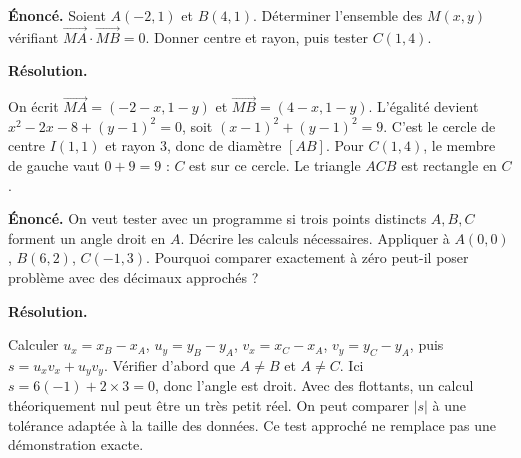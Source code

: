\documentclass[11pt,a4paper]{article}
\begin{document}
\par\noindent\begin{minipage}{\linewidth}
{\small\color{Muted}\textbf{Énoncé.} Soient $A(-2,1)$ et $B(4,1)$. Déterminer l’ensemble des $M(x,y)$ vérifiant $\overrightarrow{MA}\cdot\overrightarrow{MB}=0$. Donner centre et rayon, puis tester $C(1,4)$.}
\par\medskip
\textbf{Résolution.}\par
On écrit $\overrightarrow{MA}=(-2-x,1-y)$ et $\overrightarrow{MB}=(4-x,1-y)$. L’égalité devient $x^2-2x-8+(y-1)^2=0$, soit $(x-1)^2+(y-1)^2=9$. C’est le cercle de centre $I(1,1)$ et rayon $3$, donc de diamètre $[AB]$. Pour $C(1,4)$, le membre de gauche vaut $0+9=9$ : $C$ est sur ce cercle. Le triangle $ACB$ est rectangle en $C$.
\end{minipage}\par
\par\noindent\begin{minipage}{\linewidth}
{\small\color{Muted}\textbf{Énoncé.} On veut tester avec un programme si trois points distincts $A,B,C$ forment un angle droit en $A$. Décrire les calculs nécessaires. Appliquer à $A(0,0)$, $B(6,2)$, $C(-1,3)$. Pourquoi comparer exactement à zéro peut-il poser problème avec des décimaux approchés ?}
\par\medskip
\textbf{Résolution.}\par
Calculer $u_x=x_B-x_A$, $u_y=y_B-y_A$, $v_x=x_C-x_A$, $v_y=y_C-y_A$, puis $s=u_xv_x+u_yv_y$. Vérifier d’abord que $A\ne B$ et $A\ne C$. Ici $s=6(-1)+2\times3=0$, donc l’angle est droit. Avec des flottants, un calcul théoriquement nul peut être un très petit réel. On peut comparer $|s|$ à une tolérance adaptée à la taille des données. Ce test approché ne remplace pas une démonstration exacte.
\end{minipage}\par
\end{document}
